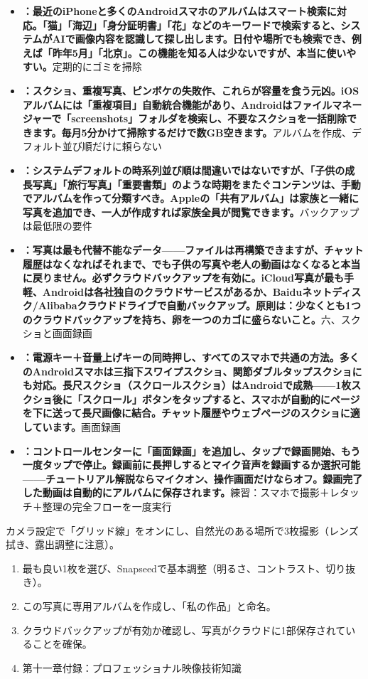 \begin{itemize}
  \item \textbf{：最近のiPhoneと多くのAndroidスマホのアルバムはスマート検索に対応。「猫」「海辺」「身分証明書」「花」などのキーワードで検索すると、システムがAIで画像内容を認識して探し出します。日付や場所でも検索でき、例えば「昨年5月」「北京」。この機能を知る人は少ないですが、本当に使いやすい。}定期的にゴミを掃除
  \item \textbf{：スクショ、重複写真、ピンボケの失敗作、これらが容量を食う元凶。iOSアルバムには「重複項目」自動統合機能があり、Androidはファイルマネージャーで「screenshots」フォルダを検索し、不要なスクショを一括削除できます。毎月5分かけて掃除するだけで数GB空きます。}アルバムを作成、デフォルト並び順だけに頼らない
  \item \textbf{：システムデフォルトの時系列並び順は間違いではないですが、「子供の成長写真」「旅行写真」「重要書類」のような時期をまたぐコンテンツは、手動でアルバムを作って分類すべき。Appleの「共有アルバム」は家族と一緒に写真を追加でき、一人が作成すれば家族全員が閲覧できます。}バックアップは最低限の要件
  \item \textbf{：写真は最も代替不能なデータ——ファイルは再構築できますが、チャット履歴はなくなればそれまで、でも子供の写真や老人の動画はなくなると本当に戻りません。必ずクラウドバックアップを有効に。iCloud写真が最も手軽、Androidは各社独自のクラウドサービスがあるか、Baiduネットディスク/Alibabaクラウドドライブで自動バックアップ。原則は：少なくとも1つのクラウドバックアップを持ち、卵を一つのカゴに盛らないこと。}六、スクショと画面録画
\end{itemize}


\begin{itemize}
  \item \textbf{：電源キー＋音量上げキーの同時押し、すべてのスマホで共通の方法。多くのAndroidスマホは三指下スワイプスクショ、関節ダブルタップスクショにも対応。長尺スクショ（スクロールスクショ）はAndroidで成熟——1枚スクショ後に「スクロール」ボタンをタップすると、スマホが自動的にページを下に送って長尺画像に結合。チャット履歴やウェブページのスクショに適しています。}画面録画
  \item \textbf{：コントロールセンターに「画面録画」を追加し、タップで録画開始、もう一度タップで停止。録画前に長押しするとマイク音声を録画するか選択可能——チュートリアル解説ならマイクオン、操作画面だけならオフ。録画完了した動画は自動的にアルバムに保存されます。}練習：スマホで撮影＋レタッチ＋整理の完全フローを一度実行
\end{itemize}

\begin{tcbpractice}{カメラ設定で「グリッド線」をオンにし、自然光のある場所で3枚撮影（レンズ拭き、露出調整に注意）。}
\begin{enumerate}
  \item 最も良い1枚を選び、Snapseedで基本調整（明るさ、コントラスト、切り抜き）。
  \item この写真に専用アルバムを作成し、「私の作品」と命名。
  \item クラウドバックアップが有効か確認し、写真がクラウドに1部保存されていることを確保。
  \item 第十一章付録：プロフェッショナル映像技術知識
\end{enumerate}

\end{tcbpractice}
